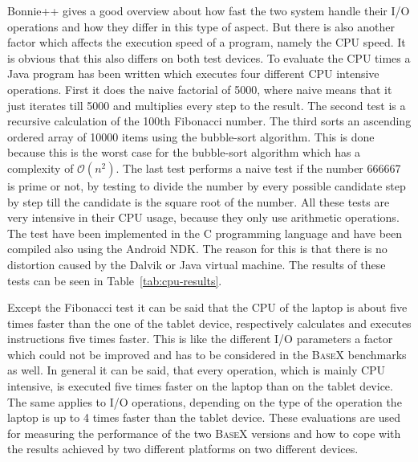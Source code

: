 Bonnie++ gives a good overview about how fast the two system handle their I/O operations and how they differ in this type of aspect.
But there is also another factor which affects the execution speed of a program, namely the CPU speed.
It is obvious that this also differs on both test devices.
To evaluate the CPU times a Java program has been written which executes four different CPU intensive operations.
First it does the naive factorial of 5000, where naive means that it just iterates till 5000 and multiplies every step to the result.
The second test is a recursive calculation of the 100th Fibonacci number.
The third sorts an ascending ordered array of 10000 items using the bubble-sort algorithm.
This is done because this is the worst case for the bubble-sort algorithm which has a complexity of $\mathcal O(n^2)$.
The last test performs a naive test if the number 666667 is prime or not, by testing to divide the number by every possible candidate step by step till the candidate is the square root of the number.
All these tests are very intensive in their CPU usage, because they only use arithmetic operations.
The test have been implemented in the C programming language and have been compiled also using the Android NDK.
The reason for this is that there is no distortion caused by the Dalvik or Java virtual machine.
The results of these tests can be seen in Table~\ref{tab:cpu-results}.

Except the Fibonacci test it can be said that the CPU of the laptop is about five times faster than the one of the tablet device, respectively calculates and executes instructions five times faster.
This is like the different I/O parameters a factor which could not be improved and has to be considered in the \textsc{BaseX} benchmarks as well.
In general it can be said, that every operation, which is mainly CPU intensive, is executed five times faster on the laptop than on the tablet device.
The same applies to I/O operations, depending on the type of the operation the laptop is up to  4 times faster than the tablet device.
These evaluations are used for measuring the performance of the two \textsc{BaseX} versions and how to cope with the results achieved by two different platforms on two different devices.

